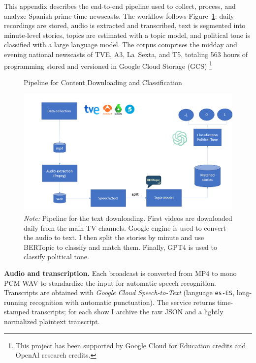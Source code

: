 \documentclass[12pt]{article}
\begin{document}
This appendix describes the end-to-end pipeline used to collect, process, and analyze Spanish prime time newscasts. The workflow follows  Figure~\ref{fig:pipeline}: daily recordings are stored, audio is extracted and transcribed, text is segmented into minute-level stories, topics are estimated with a topic model, and political tone is classified with a large language model. The corpus comprises the midday and evening national newscasts of TVE, A3, La~Sexta, and T5, totaling {563 hours} of programming stored and versioned in Google Cloud Storage (GCS) \footnote{This project has been supported by Google Cloud for Education credits and OpenAI research credits.} %






\begin{figure}[!htb]
	\centering
	\caption{Pipeline for Content Downloading and Classification }
	\includegraphics[width=150mm]{figures/pipeline3}
	\caption*{\small \textit{Note:} Pipeline for the text downloading. First videos are downloaded daily from the main TV channels. Google engine is used to convert the audio to text. I then split the stories by minute and use BERTopic to classify and match them. Finally, GPT4 is used to classify political tone.}
	\label{fig:pipeline}
\end{figure}



\textbf{Audio and transcription.} Each broadcast is converted from MP4 to mono PCM WAV to standardize the input for automatic speech recognition. Transcripts are obtained with \emph{Google Cloud Speech-to-Text} (language \texttt{es-ES}, long-running recognition with automatic punctuation). The service returns time-stamped transcripts; for each show I archive the raw JSON and a lightly normalized plaintext transcript.
\end{document}
